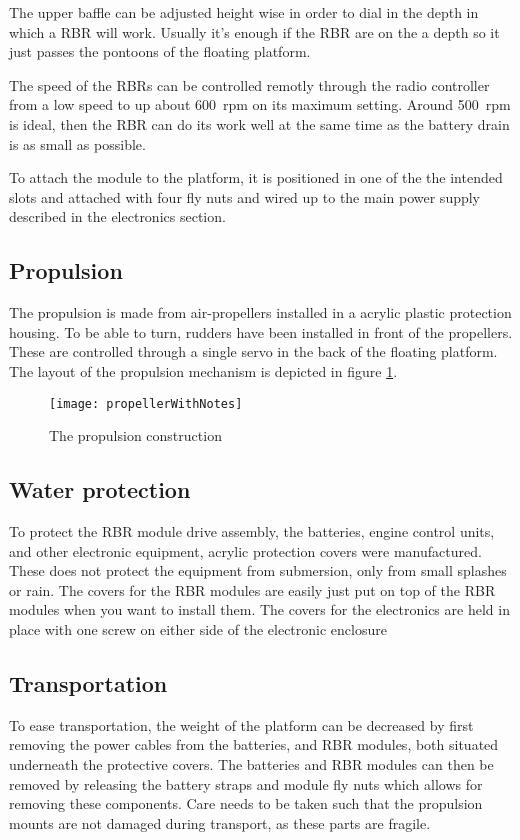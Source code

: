 The upper baffle can be adjusted height wise in order to dial in the
depth in which a RBR will work. Usually it's enough if the RBR are on the a
depth so it just passes the pontoons of the floating platform.

The speed of the RBRs can be controlled remotly through the radio controller
from a low speed to up about 600~rpm on its maximum setting. Around 500~rpm is
ideal, then the RBR can do its work well at the same time as the battery drain
is as small as possible.

To attach the module to the platform, it is positioned in one of the the
intended slots and attached with four fly nuts and wired up to the main power
supply described in the electronics section.

\subsection{Propulsion}
The propulsion is made from air-propellers installed in a acrylic plastic
protection housing. To be able to turn, rudders have been installed in
front of the propellers. These are controlled through a single servo in the back
of the floating platform. The layout of the propulsion mechanism is depicted in
figure \ref{fig:propellerWithNotes}.
\begin{figure}[h]
   \centering
   \texttt{[image: propellerWithNotes]}
   \caption{The propulsion construction}
   \label{fig:propellerWithNotes}
\end{figure}

\subsection{Water protection}
To protect the RBR module drive assembly, the batteries, engine control units, and other electronic equipment, acrylic protection covers were manufactured. These does not protect the equipment from submersion, only from small splashes or rain. The covers for the RBR modules are easily just put on top of the RBR modules when you want to install them. The covers for the electronics are held in place with one screw on either side of the electronic enclosure

\subsection{Transportation}
To ease transportation, the weight of the platform can be decreased by first removing the power cables from the batteries, and RBR modules, both situated underneath the protective covers. The batteries and RBR modules can then be removed by releasing the battery straps and module fly nuts which allows for removing these components. Care needs to be taken such that the propulsion mounts are not damaged during transport, as these parts are fragile.

